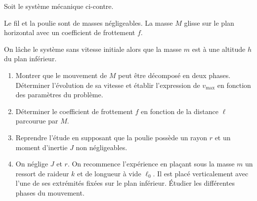     \begin{minipage}{0.48\linewidth}
        Soit le système mécanique ci-contre.\newline
        
        Le fil et la poulie sont de masses négligeables. La masse $M$ glisse sur le plan horizontal avec un coefficient de frottement $f$.\medskip
        
        On lâche le système sans vitesse initiale alors que la masse $m$ est à une altitude $h$ du plan inférieur.  
    \end{minipage}
    \hfill
    \begin{minipage}{0.5\linewidth}
        \centering
    \end{minipage}
    
    \begin{enumerate}
        \item Montrer que le mouvement de $M$ peut être décomposé en deux phases. Déterminer l'évolution de sa vitesse et établir l'expression de $v_\text{max}$ en fonction des paramètres du problème.
        
        \item Déterminer le coefficient de frottement $f$ en fonction de la distance $\ell$ parcourue par $M$.
        
        \item Reprendre l'étude en supposant que la poulie possède un rayon $r$ et un moment d'inertie $J$ non négligeables.
        
        \item On néglige $J$ et $r$. On recommence l'expérience en plaçant sous la masse $m$ un ressort de raideur $k$ et de longueur à vide $\ell_0$. Il est placé verticalement avec l'une de ses extrémités fixées sur le plan inférieur. Étudier les différentes phases du mouvement.
    \end{enumerate}
    
